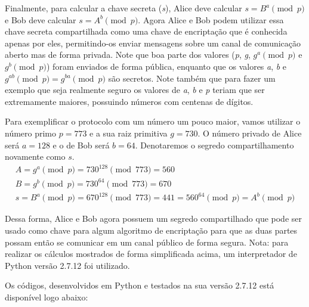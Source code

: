 \documentclass[a4paper,11pt]{article}
\theoremstyle{mytheor}
\begin{document}
Finalmente, para calcular a chave secreta (\textit{s}), Alice deve calcular $s = B^{a} \pmod{p}$ e Bob deve calcular $s = A^{b} \pmod{p}$. Agora Alice e Bob podem utilizar essa chave secreta compartilhada como uma chave de encriptação que é conhecida apenas por eles, permitindo-os enviar mensagens sobre um canal de comunicação aberto mas de forma privada. Note que boa parte dos valores (\textit{p}, \textit{g}, $g^{a} \pmod{p}$ e $g^{b} \pmod{p}$) foram enviados de forma pública, enquanto que os valores \textit{a}, \textit{b} e $g^{ab} \pmod{p} = g^{ba} \pmod{p}$ são secretos. Note também que para fazer um exemplo que seja realmente seguro os valores de \textit{a}, \textit{b} e \textit{p} teriam que ser extremamente maiores, possuindo números com centenas de dígitos.

Para exemplificar o protocolo com um número um pouco maior, vamos utilizar o número primo $p = 773$ e a sua raiz primitiva $g = 730$. O número privado de Alice será $a = 128$ e o de Bob será $b = 64$.  Denotaremos o segredo compartilhamento novamente como $s$.
\noindent \begin{align*}
A = g^{a} \pmod{p} = 730^{128} \pmod{773} = 560 \\
B = g^{b} \pmod{p} = 730^{64} \pmod{773} = 670 \\
s = B^{a} \pmod{p} = 670^{128} \pmod{773} = 441 = 560^{64} \pmod{p} = A^{b} \pmod{p}
\end{align*}

Dessa forma, Alice e Bob agora possuem um segredo compartilhado que pode ser usado como chave para algum algoritmo de encriptação para que as duas partes possam então se comunicar em um canal público de forma segura. Nota: para realizar os cálculos mostrados de forma simplificada acima, um interpretador de Python versão 2.7.12 foi utilizado.

Os códigos, desenvolvidos em Python e testados na sua versão 2.7.12 está disponível logo abaixo:
\end{document}
